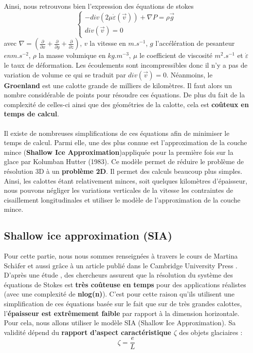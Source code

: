 \documentclass{article}
\begin{document}
Ainsi, nous retrouvons bien l'expression des équations de stokes 
\begin{equation}
\left\{
\begin{array}{l}
-div(2 \mu \dot \varepsilon(\vec{v})) + \nabla P = \rho \vec{g} \\
div(\vec{v}) = 0 \qquad
\end{array}
\right.
\label{eq1}
\end{equation}
avec $\nabla = ( \frac{\partial}{\partial x} + \frac{\partial}{\partial y} + \frac{\partial}{\partial z})$, $v$ la vitesse en $m.s^{-1}$, $g$ l'accélération de pesanteur $en m.s^{-2}$, $\rho$ la masse volumique en $kg.m^{-3}$, $\mu$ le coefficient de viscosité $m^{2}.s^{-1}$ et $\dot \varepsilon$ le taux de déformation. Les écoulements sont incompressibles donc il n'y a pas de variation de volume ce qui se traduit par $div(\vec{v}) = 0$.
\newpage
Néanmoins, le \textbf{Groenland} est une calotte grande de milliers de kilomètres. Il faut alors un nombre considérable de points pour résoudre ces équations. De plus du fait de la complexité de celles-ci ainsi que des géométries de la calotte, cela est \textbf{coûteux en temps de calcul}. 
\\\\
Il existe de nombreuses simplifications de ces équations afin de minimiser le temps de calcul. Parmi elle, une des plus connue est l'approximation de la couche mince (\textbf{Shallow Ice Approximation})appliquée pour la première fois sur la glace par Kolumban Hutter (1983). Ce modèle permet de réduire le problème de résolution 3D à un \textbf{problème 2D}. Il permet des calculs beaucoup plus simples. Ainsi, les calottes étant relativement minces, soit quelques kilomètres d'épaisseur, nous pouvons négliger les variations verticales de la vitesse les contraintes de cisaillement longitudinales et utiliser le modèle de l'approximation de la couche mince.
\newline

\subsection{Shallow ice approximation (SIA)}


Pour cette partie, nous nous sommes renseignées à travers le cours de Martina Schäfer \cite{schafer2007modelisation} et aussi grâce à un article publié dans le Cambridge University Press  \cite{seroussi_morlighem_rignot_khazendar_larour_mouginot_2013}.
\newline
D'après une étude \cite{site3}, des chercheurs assurent que la résolution du système des équations de Stokes est \textbf{très coûteuse en temps} pour des applications réalistes (avec une complexité de \textbf{nlog(n)}). C'est pour cette raison qu'ils utilisent une simplification de ces équations basée sur le fait que sur de très grandes calottes, l'\textbf{épaisseur est extrêmement faible} par rapport à la dimension horizontale. Pour cela, nous allons utiliser le modèle SIA (Shallow Ice Approximation). Sa validité dépend du \textbf{rapport d'aspect caractéristique $\zeta$} des objets glaciaires :
\begin{equation}
\zeta = \frac{e}{L}
\label{eq2} 
\end{equation}
\end{document}
